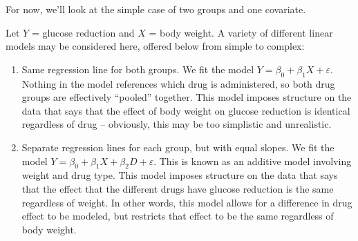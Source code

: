 \documentclass[
]{book}
\begin{document}
For now, we'll look at the simple case of two groups and one covariate.

Let \(Y\) = glucose reduction and \(X\) = body weight. A variety of different linear models may be considered here, offered below from simple to complex:

\begin{enumerate}
\def\labelenumi{\arabic{enumi}.}
\item
  Same regression line for both groups. We fit the model \(Y = \beta_0 + \beta_1 X + \varepsilon\). Nothing in the model references which drug is administered, so both drug groups are effectively ``pooled'' together. This model imposes structure on the data that says that the effect of body weight on glucose reduction is identical regardless of drug -- obviously, this may be too simplistic and unrealistic.
\item
  Separate regression lines for each group, but with equal slopes. We fit the model \(Y = \beta_0 + \beta_1 X + \beta_2 D + \varepsilon\). This is known as an additive model involving weight and drug type. This model imposes structure on the data that says that the effect that the different drugs have glucose reduction is the same regardless of weight. In other words, this model allows for a difference in drug effect to be modeled, but restricts that effect to be the same regardless of body weight.


\end{enumerate}
\end{document}
